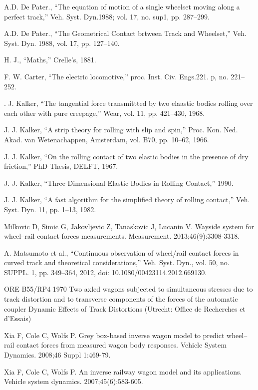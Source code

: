 \documentclass[]{interact}
\theoremstyle{plain}%
\theoremstyle{definition}
\theoremstyle{remark}
\begin{document}
\begin{thebibliography}{}
A.D. De Pater., “The equation of motion of a single wheelset moving along a perfect track,” Veh. Syst. Dyn.1988; vol. 17, no. sup1, pp. 287–299.

A.D. De Pater., “The Geometrical Contact brtween Track and Wheelset,” Veh. Syst. Dyn. 1988, vol. 17, pp. 127–140.

H. J., “Maths,” Crelle’s, 1881.

F. W. Carter, “The electric locomotive,” proc. Inst. Civ. Engs.221. p, no. 221–252.


. J. Kalker, “The tangential force transmittted by two elaastic bodies rolling over each other with pure creepage,” Wear, vol. 11, pp. 421–430, 1968.

J. J. Kalker, “A strip theory for rolling with slip and spin,” Proc. Kon. Ned. Akad. van Wetenachappen, Amsterdam, vol. B70, pp. 10–62, 1966.

J. J. Kalker, “On the rolling contact of two elastic bodies in the presence of dry friction,” PhD Thesis, DELFT, 1967.

J. J. Kalker, “Three Dimensional Elastic Bodies in Rolling Contact,” 1990.

J. J. Kalker, “A fast algorithm for the simplified theory of rolling contact,” Veh. Syst. Dyn. 11, pp. 1–13, 1982.

Milkovic D, Simic G, Jakovljevic Z, Tanaskovic J, Lucanin V. Wayside system for wheel–rail contact forces measurements. Measurement. 2013;46(9):3308-3318.

A. Matsumoto et al., “Continuous observation of wheel/rail contact forces in curved track and theoretical considerations,” Veh. Syst. Dyn., vol. 50, no. SUPPL. 1, pp. 349–364, 2012, doi: 10.1080/00423114.2012.669130.

ORE B55/RP4 1970 Two axled wagons subjected to simultaneous stresses due to track distortion and to transverse components of the forces of the automatic coupler Dynamic Effects of Track Distortions (Utrecht: Office de Recherches et d’Essais)

Xia F, Cole C, Wolfs P. Grey box-based inverse wagon model to predict wheel–rail contact forces from measured wagon body responses. Vehicle System Dynamics. 2008;46 Suppl 1:469-79.

Xia F, Cole C, Wolfs P. An inverse railway wagon model and its applications. Vehicle system dynamics. 2007;45(6):583-605.


\end{thebibliography}
\end{document}
